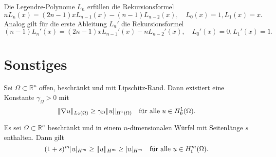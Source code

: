 \begin{Bemerkung}
\label{satz:legendre_polynome_rekursion}
    Die Legendre-Polynome $L_{n}$ erfüllen die Rekursionsformel
    \begin{equation}
        n L_{n}(x) = (2n - 1) x L_{n-1}(x) - (n - 1) L_{n-2}(x), \quad L_{0}(x) = 1, L_{1}(x) = x.
    \end{equation}
    Analog gilt für die erste Ableitung $L_{n}'$ die Rekursionsformel
    \begin{equation}
        (n - 1) L_{n}'(x) = (2n -1) x L_{n-1}'(x) - n L_{n-2}'(x), \quad L_{0}'(x) = 0, L_{1}'(x) = 1.
    \end{equation}
\end{Bemerkung}

\section{Sonstiges} %
\label{sec:sonstiges}


\begin{Satz}
\label{satz:grundlagen:poincare_friedrichs_ungleichung}
    Sei $\Omega \subset \mathbb{R}^{n}$ offen, beschränkt und mit Lipschitz-Rand.
    Dann existiert eine Konstante $\gamma_{\Omega} > 0$ mit
    \begin{equation}
        \label{eq:grundlagen:poincare_friedrichs_ungleichung}
        \norm{\grad u}_{L_{2}(\Omega)} \geq \gamma_{\Omega} \norm{u}_{H^{1}(\Omega)} \quad \fa u \in H^{1}_{0}(\Omega).
    \end{equation}
\end{Satz}

\begin{Satz}
    Es sei $\Omega \subset \mathbb{R}^{n}$ beschränkt und in einem $n$-dimensionalen Würfel mit Seitenlänge $s$ enthalten.
    Dann gilt
    \begin{equation}
        (1 + s)^{m} \lvert u\rvert_{H^{m}} \geq \lVert u\rVert_{H^{m}} \geq \lvert u\rvert_{H^{m}} \quad \text{für alle}~u \in H^{m}_{0}(\Omega).
    \end{equation}
\end{Satz}

